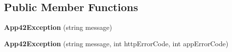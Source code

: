 \subsection*{Public Member Functions}
\begin{DoxyCompactItemize}
\item 
\hypertarget{classcom_1_1shephertz_1_1app42_1_1paas_1_1sdk_1_1windows_1_1_app42_exception_a21219d69de5017e5bac0ef156b770bbc}{{\bfseries App42\+Exception} (string message)}\label{classcom_1_1shephertz_1_1app42_1_1paas_1_1sdk_1_1windows_1_1_app42_exception_a21219d69de5017e5bac0ef156b770bbc}

\item 
\hypertarget{classcom_1_1shephertz_1_1app42_1_1paas_1_1sdk_1_1windows_1_1_app42_exception_a53001fe9fb5bdfb46912fdf1b6d15fc2}{{\bfseries App42\+Exception} (string message, int http\+Error\+Code, int app\+Error\+Code)}\label{classcom_1_1shephertz_1_1app42_1_1paas_1_1sdk_1_1windows_1_1_app42_exception_a53001fe9fb5bdfb46912fdf1b6d15fc2}


\end{DoxyCompactItemize}

